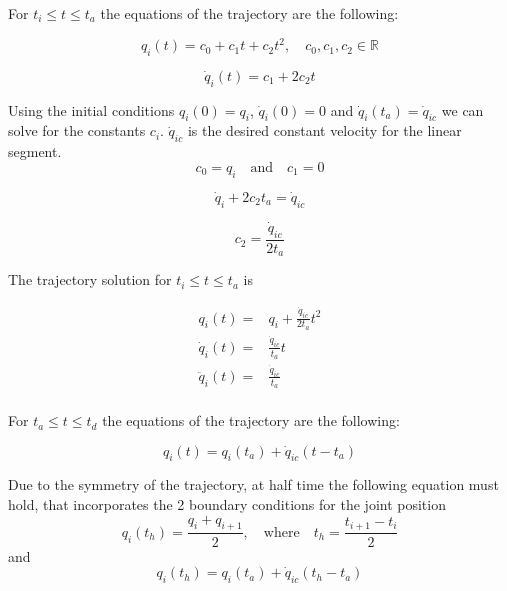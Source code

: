 For $t_i \leq t \leq t_a$ the equations of the trajectory are the following:

\begin{equation}
q_i(t) = c_0 + c_1t + c_2t^2, \quad c_0,c_1,c_2 \in \mathbb{R}
\end{equation}

\begin{equation}
\dot{q}_i(t) = c_1 + 2c_2t
\end{equation}

Using the initial conditions $q_i(0) = q_i$, $\dot{q}_i(0) = 0$ and $\dot{q}_i(t_a) = \dot{q}_{ic}$ we can solve for the constants $c_i$. $\dot{q}_{ic}$ is the desired constant velocity for the linear segment.
\begin{equation}
c_0 = q_i \quad \textrm{and} \quad c_1 = 0
\end{equation}

\[
\dot{q}_i + 2c_2t_a = \dot{q}_{ic}
\]

\begin{equation}
c_2 = \frac{\dot{q}_{ic}}{2t_a}
\end{equation}

The trajectory solution for $t_i \leq t \leq t_a$ is

\begin{equation}
\begin{aligned}
q_i(t) ={}& q_i + \frac{\dot{q}_{ic}}{2t_a}t^2 \\
\dot{q}_i(t) ={}& \frac{\dot{q}_{ic}}{t_a}t \\
\ddot{q}_i(t) ={}& \frac{\dot{q}_{ic}}{t_a} \\
\end{aligned}
\end{equation}

For $t_a \leq t \leq t_d$ the equations of the trajectory are the following:

\begin{equation}
q_i(t) = q_i(t_a) + \dot{q}_{ic}(t-t_a)
\end{equation}

Due to the symmetry of the trajectory, at half time the following equation must hold, that incorporates the 2 boundary conditions for the joint position
\begin{equation}
\label{eq:trap1}
q_i(t_{h}) = \frac{q_i + q_{i+1}}{2}, \quad \textrm{where} \quad t_h = \frac{t_{i+1} - t_i}{2}
\end{equation}
and
\begin{equation}
\label{eq:trap2}
q_i(t_{h}) = q_i(t_a) + \dot{q}_{ic}(t_h - t_a)
\end{equation}

